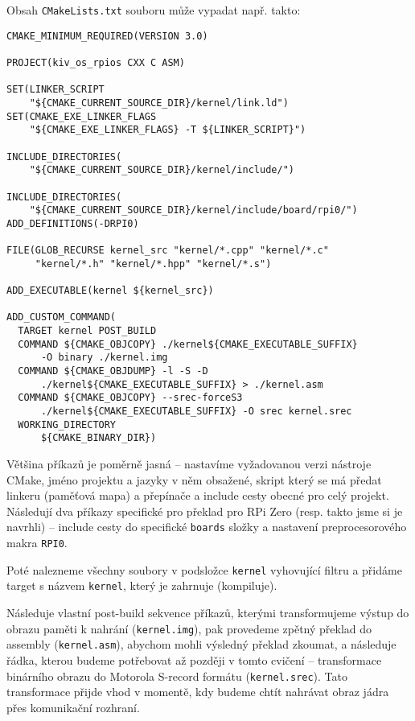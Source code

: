 \documentclass{article}
\begin{document}
Obsah \texttt{CMakeLists.txt} souboru může vypadat např. takto:

\begin{lstlisting}
CMAKE_MINIMUM_REQUIRED(VERSION 3.0)

PROJECT(kiv_os_rpios CXX C ASM)

SET(LINKER_SCRIPT
    "${CMAKE_CURRENT_SOURCE_DIR}/kernel/link.ld")
SET(CMAKE_EXE_LINKER_FLAGS
    "${CMAKE_EXE_LINKER_FLAGS} -T ${LINKER_SCRIPT}")

INCLUDE_DIRECTORIES(
    "${CMAKE_CURRENT_SOURCE_DIR}/kernel/include/")

INCLUDE_DIRECTORIES(
    "${CMAKE_CURRENT_SOURCE_DIR}/kernel/include/board/rpi0/")
ADD_DEFINITIONS(-DRPI0)

FILE(GLOB_RECURSE kernel_src "kernel/*.cpp" "kernel/*.c"
     "kernel/*.h" "kernel/*.hpp" "kernel/*.s")

ADD_EXECUTABLE(kernel ${kernel_src})

ADD_CUSTOM_COMMAND(
  TARGET kernel POST_BUILD
  COMMAND ${CMAKE_OBJCOPY} ./kernel${CMAKE_EXECUTABLE_SUFFIX}
      -O binary ./kernel.img
  COMMAND ${CMAKE_OBJDUMP} -l -S -D
      ./kernel${CMAKE_EXECUTABLE_SUFFIX} > ./kernel.asm
  COMMAND ${CMAKE_OBJCOPY} --srec-forceS3
      ./kernel${CMAKE_EXECUTABLE_SUFFIX} -O srec kernel.srec
  WORKING_DIRECTORY
      ${CMAKE_BINARY_DIR})
\end{lstlisting}

Většina příkazů je poměrně jasná -- nastavíme vyžadovanou verzi nástroje CMake, jméno projektu a jazyky v něm obsažené, skript který se má předat linkeru (paměťová mapa) a přepínače a include cesty obecné pro celý projekt. Následují dva příkazy specifické pro překlad pro RPi Zero (resp. takto jsme si je navrhli) -- include cesty do specifické \texttt{boards} složky a nastavení preprocesorového makra \texttt{RPI0}.

Poté nalezneme všechny soubory v podsložce \texttt{kernel} vyhovující filtru a přidáme target s názvem \texttt{kernel}, který je zahrnuje (kompiluje).

Následuje vlastní post-build sekvence příkazů, kterými transformujeme výstup do obrazu paměti k nahrání (\texttt{kernel.img}), pak provedeme zpětný překlad do assembly (\texttt{kernel.asm}), abychom mohli výsledný překlad zkoumat, a následuje řádka, kterou budeme potřebovat až později v tomto cvičení -- transformace binárního obrazu do Motorola S-record formátu (\texttt{kernel.srec}). Tato transformace přijde vhod v momentě, kdy budeme chtít nahrávat obraz jádra přes komunikační rozhraní.
\end{document}
